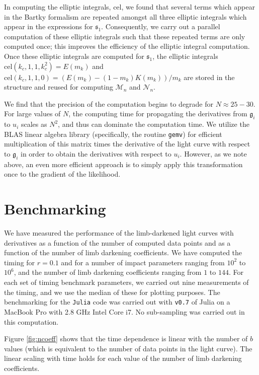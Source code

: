 \documentclass[modern]{aastex61}
\begin{document}
In computing the elliptic integrals, cel, we found that several terms
which appear in the Bartky formalism are repeated amongst all three elliptic 
integrals which appear in the expressions for $\mathfrak{s}_1$.  Consequently, we carry 
out a parallel computation of these elliptic integrals such that these
repeated terms are only computed once;  this improves the efficiency of
the elliptic integral computation.  Once these elliptic integrals
are computed for $\mathfrak{s}_1$, the elliptic integrals $\mathrm{cel}(k_c,1,1,k_c^2)=E(m_k)$
and $\mathrm{cel}(k_c,1,1,0)=(E(m_k)-(1-m_k)K(m_k))/m_k $ are
stored in the structure and reused for computing $\mathcal{M}_n$
and $\mathcal{N}_n$.

We find that the precision of the computation begins to degrade for
$N \approx 25-30$.  For large values of $N$, the computing time for
propagating the derivatives from $\mathfrak{g}_i$ to $u_i$ scales as $N^2$, and
thus can dominate the computation time.  We utilize the BLAS linear
algebra library (specifically, the routine \texttt{gemv}) for efficient 
multiplication of this matrix times the derivative of the light curve with 
respect to $\mathfrak{g}_i$ in order to obtain the derivatives with respect to $u_i$.
However, as we note above, an even more efficient approach is to
simply apply this transformation once to the gradient of the likelihood.

\section{Benchmarking}\label{sec:benchmark}

We have measured the performance of the limb-darkened light curves
with derivatives as a function of the number of computed data points
and as a function of the number of limb darkening coefficients.  We
have computed the timing for $r=0.1$ and for a number of impact
parameters ranging from $10^2$ to $10^6$, and the number of limb darkening
coefficients ranging from $1$ to $144$.  For each set of timing benchmark
parameters, we carried out nine measurements  of the timing, and
we use the median of these for plotting purposes.  The benchmarking
for the \texttt{Julia} code was carried out with \texttt{v0.7} of
Julia on a MacBook Pro with 2.8 GHz Intel Core i7.
No sub-sampling was carried out in this computation. 

Figure \ref{fig:ncoeff} shows that the time dependence is linear with the
number of $b$ values (which is equivalent to the number of data points
in the light curve).  The linear scaling with time holds for each value of
the number of limb darkening coefficients.
\end{document}
